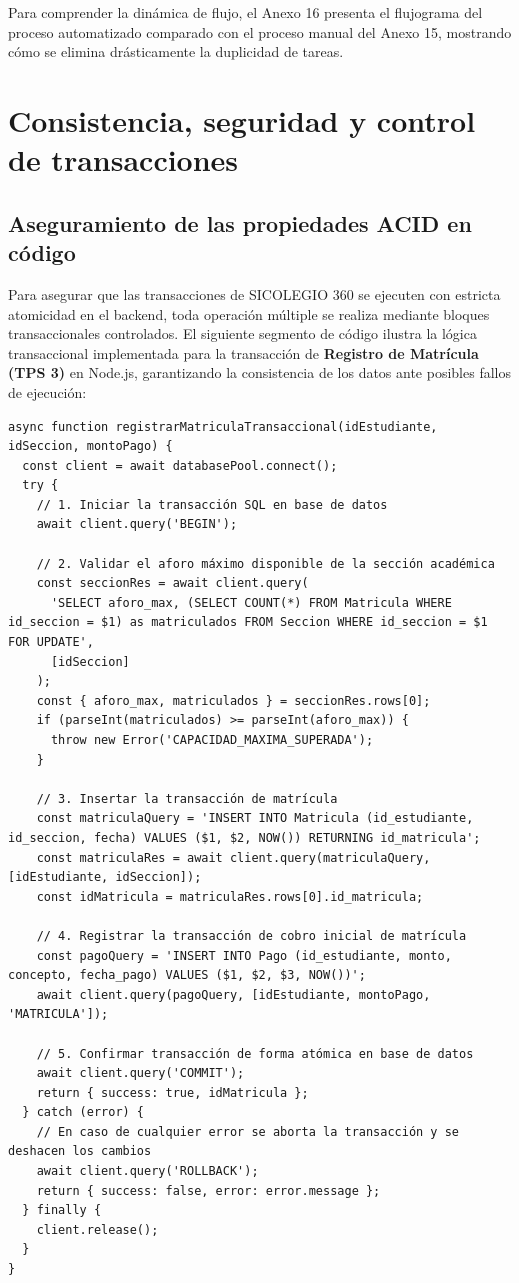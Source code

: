 \documentclass[12pt,a4paper,oneside]{report}
\begin{document}
Para comprender la dinámica de flujo, el Anexo 16 presenta el flujograma del proceso automatizado comparado con el proceso manual del Anexo 15, mostrando cómo se elimina drásticamente la duplicidad de tareas.

\section{Consistencia, seguridad y control de transacciones}

\subsection{Aseguramiento de las propiedades ACID en código}
Para asegurar que las transacciones de SICOLEGIO 360 se ejecuten con estricta atomicidad en el backend, toda operación múltiple se realiza mediante bloques transaccionales controlados. El siguiente segmento de código ilustra la lógica transaccional implementada para la transacción de \textbf{Registro de Matrícula (TPS 3)} en Node.js, garantizando la consistencia de los datos ante posibles fallos de ejecución:

\begin{verbatim}
async function registrarMatriculaTransaccional(idEstudiante, idSeccion, montoPago) {
  const client = await databasePool.connect();
  try {
    // 1. Iniciar la transacción SQL en base de datos
    await client.query('BEGIN');

    // 2. Validar el aforo máximo disponible de la sección académica
    const seccionRes = await client.query(
      'SELECT aforo_max, (SELECT COUNT(*) FROM Matricula WHERE id_seccion = $1) as matriculados FROM Seccion WHERE id_seccion = $1 FOR UPDATE',
      [idSeccion]
    );
    const { aforo_max, matriculados } = seccionRes.rows[0];
    if (parseInt(matriculados) >= parseInt(aforo_max)) {
      throw new Error('CAPACIDAD_MAXIMA_SUPERADA');
    }

    // 3. Insertar la transacción de matrícula
    const matriculaQuery = 'INSERT INTO Matricula (id_estudiante, id_seccion, fecha) VALUES ($1, $2, NOW()) RETURNING id_matricula';
    const matriculaRes = await client.query(matriculaQuery, [idEstudiante, idSeccion]);
    const idMatricula = matriculaRes.rows[0].id_matricula;

    // 4. Registrar la transacción de cobro inicial de matrícula
    const pagoQuery = 'INSERT INTO Pago (id_estudiante, monto, concepto, fecha_pago) VALUES ($1, $2, $3, NOW())';
    await client.query(pagoQuery, [idEstudiante, montoPago, 'MATRICULA']);

    // 5. Confirmar transacción de forma atómica en base de datos
    await client.query('COMMIT');
    return { success: true, idMatricula };
  } catch (error) {
    // En caso de cualquier error se aborta la transacción y se deshacen los cambios
    await client.query('ROLLBACK');
    return { success: false, error: error.message };
  } finally {
    client.release();
  }
}
\end{verbatim}
\end{document}
